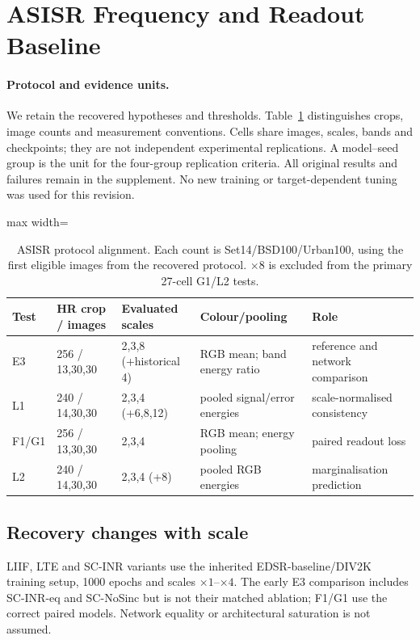 \section{ASISR Frequency and Readout Baseline}\label{sec:exp}
\paragraph{Protocol and evidence units.} We retain the recovered hypotheses and thresholds. Table~\ref{tab:protocol-main} distinguishes crops, image counts and measurement conventions. Cells share images, scales, bands and checkpoints; they are not independent experimental replications. A model--seed group is the unit for the four-group replication criteria. All original results and failures remain in the supplement. No new training or target-dependent tuning was used for this revision.

\begin{table}[t]\centering\small
\caption{ASISR protocol alignment. Each count is Set14/BSD100/Urban100, using the first eligible images from the recovered protocol. $\times8$ is excluded from the primary 27-cell G1/L2 tests.}\label{tab:protocol-main}
\begin{adjustbox}{max width=\linewidth}\begin{tabular}{lllll}\toprule
Test & HR crop / images & Evaluated scales & Colour/pooling & Role\\\midrule
E3 & 256 / 13,30,30 & 2,3,8 (+historical 4) & RGB mean; band energy ratio & reference and network comparison\\
L1 & 240 / 14,30,30 & 2,3,4 (+6,8,12) & pooled signal/error energies & scale-normalised consistency\\
F1/G1 & 256 / 13,30,30 & 2,3,4 & RGB mean; energy pooling & paired readout loss\\
L2 & 240 / 14,30,30 & 2,3,4 (+8) & pooled RGB energies & marginalisation prediction\\\bottomrule
\end{tabular}\end{adjustbox}
\end{table}

\subsection{Recovery changes with scale}\label{sec:recovery-main}
LIIF, LTE and SC-INR variants use the inherited EDSR-baseline/DIV2K training setup, 1000 epochs and scales $\times1$--$\times4$. The early E3 comparison includes SC-INR-eq and SC-NoSinc but is not their matched ablation; F1/G1 use the correct paired models. Network equality or architectural saturation is not assumed.

